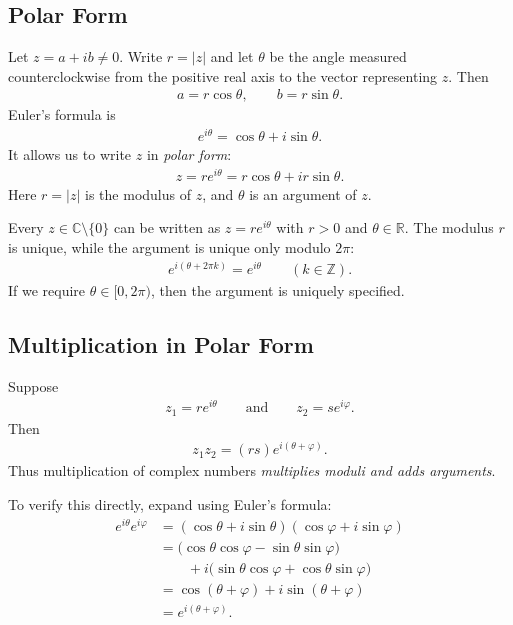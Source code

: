 \documentclass[11pt]{article}
\theoremstyle{plain}
\theoremstyle{definition}
\theoremstyle{remark}
\numberwithin{equation}{section}
\newcommand{\be}{\begin{eqnarray}}
\newcommand{\ee}{\end{eqnarray}}
\newcommand{\C}{\mathbb{C}}
\newcommand{\R}{\mathbb{R}}
\newcommand{\RePart}{\operatorname{Re}}
\newcommand{\ImPart}{\operatorname{Im}}
\begin{document}
\subsection*{Polar Form}

Let $z=a+ib\ne 0$.  Write $r=|z|$ and let $\theta$ be the angle measured
counterclockwise from the positive real axis to the vector representing $z$.
Then
\be
  a=r\cos\theta,
  \qquad
  b=r\sin\theta.
\ee
Euler's formula is
\be
  e^{i\theta}=\cos\theta+i\sin\theta.
\ee
It allows us to write $z$ in \emph{polar form}:
\be
  \boxed{z=re^{i\theta}}
  =r\cos\theta+i r\sin\theta.
\ee
Here $r=|z|$ is the modulus of $z$, and $\theta$ is an argument of $z$.

\begin{center}
\end{center}

Every $z\in\C\setminus\{0\}$ can be written as $z=re^{i\theta}$ with
$r>0$ and $\theta\in\R$.  The modulus $r$ is unique, while the argument is
unique only modulo $2\pi$:
\be
  e^{i(\theta+2\pi k)}=e^{i\theta}
  \qquad (k\in\mathbb Z).
\ee
If we require $\theta\in[0,2\pi)$, then the argument is uniquely specified.

\subsection*{Multiplication in Polar Form}

Suppose
\be
  z_1=re^{i\theta}
  \qquad\text{and}\qquad
  z_2=se^{i\varphi}.
\ee
Then
\be
  z_1z_2=(rs)e^{i(\theta+\varphi)}.
\ee
Thus multiplication of complex numbers \emph{multiplies moduli and adds
arguments}.

To verify this directly, expand using Euler's formula:
\begin{align}
  e^{i\theta}e^{i\varphi}
  &= (\cos\theta+i\sin\theta)(\cos\varphi+i\sin\varphi)\\
  &= \bigl(\cos\theta\cos\varphi-\sin\theta\sin\varphi\bigr)\\
  &\qquad
     +i\bigl(\sin\theta\cos\varphi+\cos\theta\sin\varphi\bigr)\\
  &= \cos(\theta+\varphi)+i\sin(\theta+\varphi)\\
  &= e^{i(\theta+\varphi)}.
\end{align}
\end{document}
